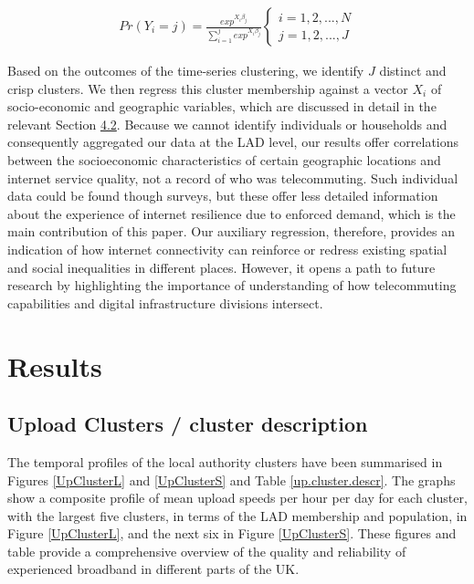 \documentclass[Royal,times,sageh]{sagej}
\begin{document}
\begin{align}
Pr(Y_{i}=j) = \frac{exp^{X_{i}\beta_{j}}}{\sum_{i=1}^j exp^{X_{i}\beta_{j}}}
\begin{cases}
    i = 1, 2, ... , N \\  
    j = 1, 2, ... , J
\end{cases}\label{eq1}
\end{align}

Based on the outcomes of the time-series clustering, we identify \(J\)
distinct and crisp clusters. We then regress this cluster membership
against a vector \(X_{i}\) of socio-economic and geographic variables,
which are discussed in detail in the relevant Section
\protect\hyperlink{sec:4.2}{4.2}. Because we cannot identify individuals
or households and consequently aggregated our data at the LAD level, our
results offer correlations between the socioeconomic characteristics of
certain geographic locations and internet service quality, not a record
of who was telecommuting. Such individual data could be found though
surveys, but these offer less detailed information about the experience
of internet resilience due to enforced demand, which is the main
contribution of this paper. Our auxiliary regression, therefore,
provides an indication of how internet connectivity can reinforce or
redress existing spatial and social inequalities in different places.
However, it opens a path to future research by highlighting the
importance of understanding of how telecommuting capabilities and
digital infrastructure divisions intersect.

\hypertarget{sec:4}{%
\section{Results}\label{sec:4}}

\hypertarget{sec:4.1}{%
\subsection{Upload Clusters / cluster description}\label{sec:4.1}}

The temporal profiles of the local authority clusters have been
summarised in Figures \ref{UpClusterL} and \ref{UpClusterS} and Table
\ref{up.cluster.descr}. The graphs show a composite profile of mean
upload speeds per hour per day for each cluster, with the largest five
clusters, in terms of the LAD membership and population, in Figure
\ref{UpClusterL}, and the next six in Figure \ref{UpClusterS}. These
figures and table provide a comprehensive overview of the quality and
reliability of experienced broadband in different parts of the UK.
\end{document}
